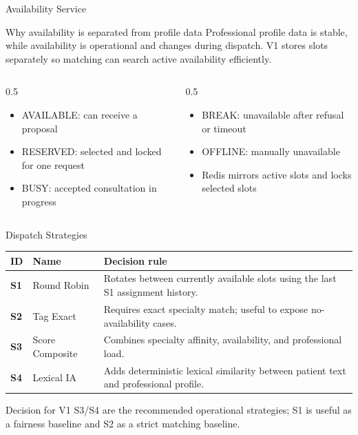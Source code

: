\documentclass[aspectratio=169,11pt]{beamer}
\begin{document}
\begin{frame}{Availability Service}
  \begin{block}{Why availability is separated from profile data}
    Professional profile data is stable, while availability is operational and changes during dispatch. V1 stores slots separately so matching can search active availability efficiently.
  \end{block}

  \begin{columns}[T]
    \begin{column}{0.5\textwidth}
      \begin{itemize}
        \item AVAILABLE: can receive a proposal
        \item RESERVED: selected and locked for one request
        \item BUSY: accepted consultation in progress
      \end{itemize}
    \end{column}
    \begin{column}{0.5\textwidth}
      \begin{itemize}
        \item BREAK: unavailable after refusal or timeout
        \item OFFLINE: manually unavailable
        \item Redis mirrors active slots and locks selected slots
      \end{itemize}
    \end{column}
  \end{columns}
\end{frame}

\begin{frame}{Dispatch Strategies}
  \begin{tabularx}{\textwidth}{>{\bfseries}l l X}
    \toprule
    ID & Name & Decision rule\\
    \midrule
    S1 & Round Robin & Rotates between currently available slots using the last S1 assignment history.\\
    S2 & Tag Exact & Requires exact specialty match; useful to expose no-availability cases.\\
    S3 & Score Composite & Combines specialty affinity, availability, and professional load.\\
    S4 & Lexical IA & Adds deterministic lexical similarity between patient text and professional profile.\\
    \bottomrule
  \end{tabularx}

  \vspace{0.35cm}
  \begin{block}{Decision for V1}
    S3/S4 are the recommended operational strategies; S1 is useful as a fairness baseline and S2 as a strict matching baseline.
  \end{block}
\end{frame}
\end{document}
